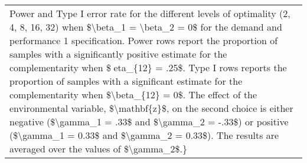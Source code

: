 \begin{table}
\begin{tabular}[t]{lrrrrrrrrrrrrr}
\multicolumn{14}{l}{Power and Type I error rate for the different levels of optimality (2, 4, 8, 16, 32) when \$\textbackslash{}beta\_1 = \textbackslash{}beta\_2 = 0\$ for the demand and performance 1 specification. Power rows report the proportion of samples with a significantly positive estimate for the complementarity when \$eta\_\{12\} = .25\$. Type I rows reports the proportion of samples with a significant estimate for the complementarity when \$\textbackslash{}beta\_\{12\} = 0\$. The effect of the environmental variable, \$\textbackslash{}mathbf\{z\}\$, on the second choice is either negative (\$\textbackslash{}gamma\_1 = .33\$ and \$\textbackslash{}gamma\_2 = -.33\$) or positive (\$\textbackslash{}gamma\_1 = 0.33\$ and \$\textbackslash{}gamma\_2 = 0.33\$). The results are averaged over the values of \$\textbackslash{}gamma\_2\$.\}}\\
\end{tabular}
\end{table}